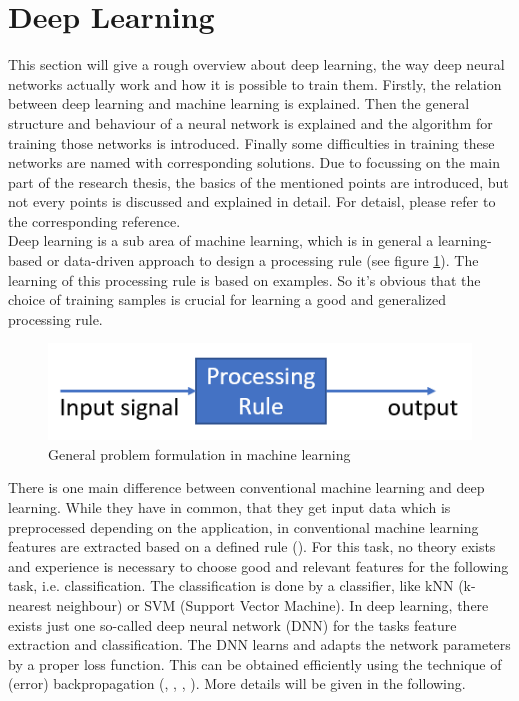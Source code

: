 \documentclass[12pt,DIV14,BCOR12mm,a4paper,footexclude,headinclude,halfparskip-,twoside,openright,openany,cleardoubleempty,idxtotoc,bibtotoc]{scrreprt} %
\numberwithin{equation}{chapter}
\begin{document}
\section{Deep Learning}
This section will give a rough overview about deep learning, the way deep neural networks actually work and how it is possible to train them. Firstly, the relation between deep learning and machine learning is explained. Then the general structure and behaviour of a neural network is explained and the algorithm for training those networks is introduced. Finally some difficulties in training these networks are named with corresponding solutions. Due to focussing on the main part of the research thesis, the basics of the mentioned points are introduced, but not every points is discussed and explained in detail. For detaisl, please refer to the corresponding reference.\\
Deep learning is a sub area of machine learning, which is in general a learning-based or data-driven approach to design a processing rule (see figure \ref{fig:ProcessingRule}). The learning of this processing rule is based on examples. So it's obvious that the choice of training samples is crucial for learning a good and generalized processing rule. 
\begin{figure}[htb!]
	\centering
	\includegraphics[width=0.5\linewidth]{Graphiken/ProcessingRule}
	\caption{General problem formulation in machine learning}
	\label{fig:ProcessingRule}
\end{figure}
There is one main difference between conventional machine learning and deep learning. While they have in common, that they get input data which is preprocessed depending on the application, in conventional machine learning features are extracted based on a defined rule (\cite{Goodfellow-et-al-2016}). For this task, no theory exists and experience is necessary to choose good and relevant features for the following task, i.e. classification. The classification is done by a classifier, like kNN (k-nearest neighbour) or SVM (Support Vector Machine). In deep learning, there exists just one so-called deep neural network (DNN) for the tasks feature extraction and classification. The DNN learns and adapts the network parameters by a proper loss function. This can be obtained efficiently using the technique of (error) backpropagation (\cite{Goodfellow-et-al-2016}, \cite{Nielsen-Michael}, \cite{DeepLearningDive}, \cite{Bishop}). More details will be given in the following.\\
\end{document}
